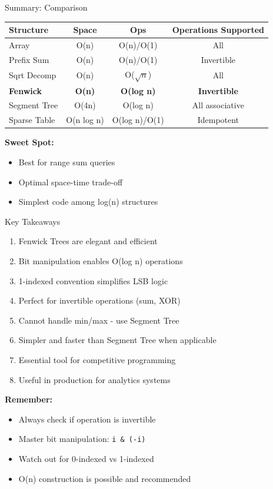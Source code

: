\documentclass[aspectratio=169]{beamer}
\begin{document}
\begin{frame}{Summary: Comparison}
  \begin{table}
    \centering
    \footnotesize
    \begin{tabular}{|l|c|c|c|}
      \hline
      \textbf{Structure} & \textbf{Space} & \textbf{Ops} & \textbf{Operations Supported} \\
      \hline
      Array & O(n) & O(n)/O(1) & All \\
      Prefix Sum & O(n) & O(n)/O(1) & Invertible \\
      Sqrt Decomp & O(n) & O($\sqrt{n}$) & All \\
      \textbf{Fenwick} & \textbf{O(n)} & \textbf{O(log n)} & \textbf{Invertible} \\
      Segment Tree & O(4n) & O(log n) & All associative \\
      Sparse Table & O(n log n) & O(log n)/O(1) & Idempotent \\
      \hline
    \end{tabular}
  \end{table}

  \vspace{0.5cm}
  \textbf{Sweet Spot:}
  \begin{itemize}
    \item Best for range sum queries
    \item Optimal space-time trade-off
    \item Simplest code among log(n) structures
  \end{itemize}
\end{frame}

\begin{frame}{Key Takeaways}
  \begin{enumerate}
    \item Fenwick Trees are elegant and efficient
    \item Bit manipulation enables O(log n) operations
    \item 1-indexed convention simplifies LSB logic
    \item Perfect for invertible operations (sum, XOR)
    \item Cannot handle min/max - use Segment Tree
    \item Simpler and faster than Segment Tree when applicable
    \item Essential tool for competitive programming
    \item Useful in production for analytics systems
  \end{enumerate}

  \vspace{0.5cm}
  \textbf{Remember:}
  \begin{itemize}
    \item Always check if operation is invertible
    \item Master bit manipulation: \texttt{i \& (-i)}
    \item Watch out for 0-indexed vs 1-indexed
    \item O(n) construction is possible and recommended
  \end{itemize}
\end{frame}
\end{document}

